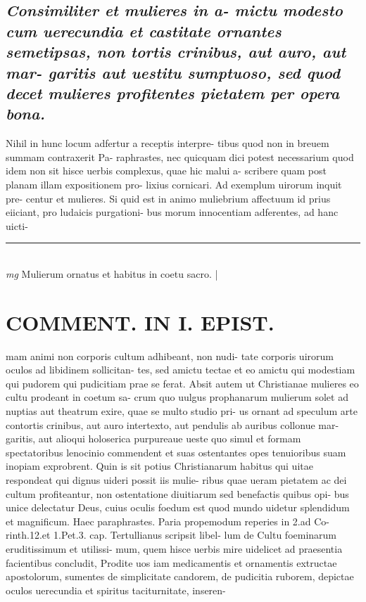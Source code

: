 \documentclass{article}
\begin{document}
\begin{pages}
\subsection*{\textit{Consimiliter et mulieres in a- mictu modesto cum uerecundia et castitate ornantes semetipsas, non tortis crinibus, aut auro, aut mar- garitis aut uestitu sumptuoso, sed quod decet mulieres profitentes pietatem per opera bona. }}\pstart Nihil in hunc locum adfertur a receptis interpre- tibus quod non in breuem summam contraxerit Pa- raphrastes, nec quicquam dici potest necessarium quod idem non sit hisce uerbis complexus, quae hic malui a- scribere quam post planam illam expositionem pro- lixius cornicari. Ad exemplum uirorum inquit pre- centur et mulieres. Si quid est in animo muliebrium affectuum id prius eiiciant, pro ludaicis purgationi- bus morum innocentiam adferentes, ad hanc uicti-  \pend
\vspace{0.5cm}\noindent
\vspace{0.2cm}\rule{1cm}{0.2pt}\\ 
\hspace{0.2cm}\textit{mg}
\footnotesize Mulierum ornatus et habitus in coetu sacro. 
\normalsize| 
\section*{COMMENT. IN I. EPIST. }\pstart mam animi non corporis cultum adhibeant, non nudi- tate corporis uirorum oculos ad libidinem sollicitan- tes, sed amictu tectae et eo amictu qui modestiam qui pudorem qui pudicitiam prae se ferat. Absit autem ut Christianae mulieres eo cultu prodeant in coetum sa- crum quo uulgus prophanarum mulierum solet ad nuptias aut theatrum exire, quae se multo studio pri- us ornant ad speculum arte contortis crinibus, aut auro intertexto, aut pendulis ab auribus collonue mar- garitis, aut alioqui holoserica purpureaue ueste quo simul et formam spectatoribus lenocinio commendent et suas ostentantes opes tenuioribus suam inopiam exprobrent. Quin is sit potius Christianarum habitus qui uitae respondeat qui dignus uideri possit iis mulie- ribus quae ueram pietatem ac dei cultum profiteantur, non ostentatione diuitiarum sed benefactis quibus opi- bus unice delectatur Deus, cuius oculis foedum est quod mundo uidetur splendidum et magnificum. Haec paraphrastes. Paria propemodum reperies in 2.ad Co- rinth.12.et 1.Pet.3. cap. Tertullianus scripsit libel- lum de Cultu foeminarum eruditissimum et utilissi- mum, quem hisce uerbis mire uidelicet ad praesentia facientibus concludit, Prodite uos iam medicamentis et ornamentis extructae apostolorum, sumentes de simplicitate candorem, de pudicitia ruborem, depictae oculos uerecundia et spiritus taciturnitate, inseren-  \pend

\end{pages}
\end{document}
